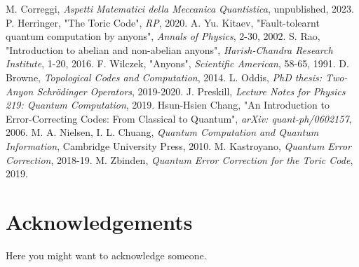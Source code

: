 \documentclass{Configuration_Files/PoliMi3i_thesis}
\begin{document}
\begin{thebibliography}{99} %
	 M. Correggi, \textit{Aspetti Matematici della Meccanica Quantistica}, unpublished, 2023.
	 P. Herringer, "The Toric Code", {\it RP}, 2020.
	 A. Yu. Kitaev, "Fault-tolearnt quantum computation by anyons", {\it Annals of Physics}, 2-30, 2002.
	 S. Rao, "Introduction to abelian and non-abelian anyons", {\it Harish-Chandra Research Institute}, 1-20, {2016}.
	 F. Wilczek, "Anyons", {\it Scientific American}, 58-65, 1991.
	 D. Browne, {\it Topological Codes and Computation}, 2014.
	 L. Oddis, {\it PhD thesis: Two-Anyon Schrödinger Operators}, 2019-2020.
	 J. Preskill, {\it Lecture Notes for Physics 219:
	 Quantum Computation}, 2019.
	 Hsun-Hsien Chang, "An Introduction to Error-Correcting Codes: From Classical to Quantum", {\it arXiv: quant-ph/0602157}, 2006.
	 M. A. Nielsen, I. L. Chuang, {\it Quantum Computation and Quantum Information}, Cambridge University Press, 2010.
	 M. Kastroyano, {\it Quantum Error Correction}, 2018-19.
	 M. Zbinden, {\it Quantum Error Correction for the Toric Code}, 2019.
\end{thebibliography}



\cleardoublepage
{} %


\listoffigures



\chapter*{Acknowledgements}
Here you might want to acknowledge someone.

\cleardoublepage
\end{document}
